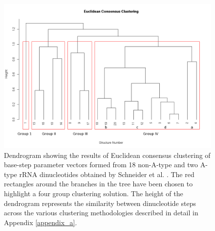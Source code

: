 \begin{figure}[htbp]
 \centering
\includegraphics[angle=90, scale=0.5]{Chapter2/eucli_cons_nonA-RNA.png}
\caption{Dendrogram  showing   the  results  of   Euclidean  consensus
  clustering of base-step parameter  vectors formed from 18 non-A-type
  and  two A-type  rRNA  dinucleotides obtained  by  Schneider et  al.
  \cite{schneider2004}.  The red rectangles around the branches in the
  tree  have  been  chosen   to  highlight  a  four  group  clustering
  solution.  The height  of the  dendrogram represents  the similarity
  between   dinucleotide   steps   across   the   various   clustering
  methodologies described in detail in Appendix \ref{appendix_a}.}
 \label{fig:eucl_cons}
\end{figure}


